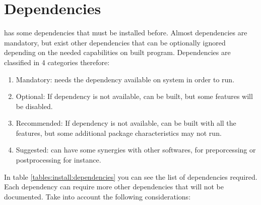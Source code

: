 \section{Dependencies}
%
\NAME has some dependencies that must be installed before. Almost dependencies
are mandatory, but exist other dependencies that can be optionally ignored
depending on the needed capabilities on \NAME built program.\rc
%
Dependencies are classified in 4 categories therefore:
%
\begin{enumerate}
	\item Mandatory: \NAME needs the dependency available on system in order to
	run.
	\item Optional: If dependency is not available, \NAME can be built, but some
	features will be disabled.
	\item Recommended: If dependency is not available, \NAME can be built with
	all the features, but some
	additional package characteristics may not run.
	\item Suggested: \NAME can have some synergies with other softwares, for
	preporcessing or postprocessing for instance.
\end{enumerate}
%
In table \ref{tables:install:dependencies} you can see the list of dependencies
required. Each dependency can require more other dependencies that will not be
documented. Take into account the following considerations:
%
